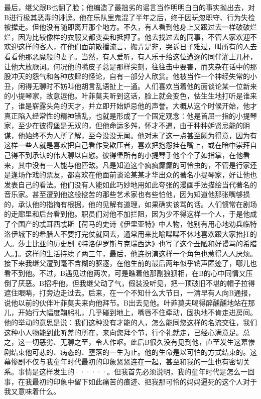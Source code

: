 \documentclass[12pt, UTF8]{ctexbook}
\begin{document}
\par 最后，继父跟B也翻了脸；他编造了最拙劣的谣言当作明明白白的事实抛出去，对B进行极其恶毒的诽谤。他在乐队里鬼混了半年之后，终于因玩忽职守、行为失检被撵走。但他没有随即离开那个地方。不久，有人看到他身上又跟过去一样破破烂烂，因为比较像样的衣服又都变卖和抵押了。他去找过去的同事，不管人家欢迎不欢迎这样的客人，在他们面前散播流言，搬弄是非，哭诉日子难过，叫所有的人去看看他那恶魔般的妻子。当然，有人爱听，有人乐于给这位遭逐的同伴灌上几杯，让他大放厥词。何况他的嘴皮子总是那样尖刻，往往击中要害，而夹杂在话中的那股冲天的怨气和各种放肆的怪论，自有一部分人欣赏。他被当作一个神经失常的小丑，闲得无聊时不妨叫他胡言乱语扯上一通。人们喜欢当着他的面谈论某一位新来的小提琴家，故意逗他。叶菲莫夫听到这话，脸上就会变色，怯生生地打听是谁来了，谁是崭露头角的天才，并立即开始妒忌他的声誉。大概从这个时候开始，他才真正陷入经常性的精神错乱，也就是形成了一个固定观念：他是首屈一指的小提琴家，至少在彼得堡是无双的，但他命运多舛，怀才不遇，由于种种妒贤忌能的阴谋，他始终不为人所了解，至今没没无闻。他对末了这一点甚至颇为得意，因为有这样一些人就是喜欢把自己看作受欺压者，喜欢把抱怨挂在嘴上，或在暗中崇拜自己得不到承认的伟大聊以自慰。彼得堡所有的小提琴手他个个了如指掌，在他看来，其中没有一人能与他匹敌。凡是知道这个疯疯癫癫的可怜虫的，不管是行家还是逢场作戏的票友，都喜欢在他面前谈论某某才华出众的著名小提琴家，好让他也发表自己的看法。他们没有人能如此巧妙地用如此夸张的漫画手法描绘当代著名的音乐家。甚至遭到他这般挖苦的那些艺术家也有些怕他，因为知道他那张嘴够损的，承认他的指摘有根据，他的见解有道理，如果确实该骂的话。人们惯常在剧场的走廊里和后台看到他。职员们对他不加拦阻，因为少不得这样一个人，于是他成了个国产的忒耳西忒斯【荷马的史诗《伊里亚特》中人物，他别有用心地劝兵临特洛伊城下的希腊人不要打完仗就回去，通常用来比喻喋喋不休地喜欢跟大家抬扛的人。莎士比亚的历史剧《特洛伊罗斯与克瑞西达》也写了这个丑陋和好谩骂的希腊人。】。这样的生活持续了两三年，最后，他连扮演这样一个角色也惹得人人厌烦。接下来我继父遭到毫不含糊的驱逐，在他生前的最后两年似乎销声匿迹了，哪儿也看不到他。不过，B遇见过他两次，可是瞧着他那副狼狈相，在B的心中同情又压倒了厌恶。B招呼他，但我继父动了气，假装没听见，把一顶破旧不堪的帽子拉得遮住眼睛，打旁边走过去。后来，在一个不知什么大节日，一清早有人向B通报，说他以前的伙伴叶菲莫夫来向他拜节。B出去见他。叶菲莫夫喝得醉醺醺地站在那儿，开始行大幅度鞠躬礼，几乎碰到地上，嘴唇不住牵动，固执地不肯走进房间。他的举动的意思是说：我们这种没有才能的人，怎么能同您这样的名流交往，我们这种小人物能到此听差的所在，来向您拜个节，行个礼就走，已经心满意足。总之，这一切恶劣、无聊之至，令人作呕。此后B很久没有见到他，直至发生这幕惨剧结束他可悲的、病态的、堕落的一生为止。他的生命是以可怕的方式结束的。这幕惨剧不仅与我童年时代最初的印象紧紧连在一起，甚至和我的一生也有密切关系。事情是这样发生的······。但我首先必须说明，我的童年时代是怎么一回事，在我最初的印象中留下如此痛苦的痕迹、把我那可怜的妈妈逼死的这个人对于我又意味着什么。
\end{document}
